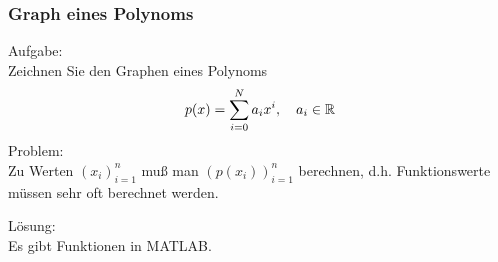 \begin{frame}[fragile]\frametitle{Graph eines Polynoms}

\alert{Aufgabe:}\\
Zeichnen Sie  den Graphen eines Polynoms
\vspace*{-0.4cm}
\[ p(x)= \sum_{i=0}^N a_i x^i, \quad a_i \in \mathbb{R} 
\vspace*{-0.4cm} \]
\alert{Problem:}\\
Zu Werten $(x_i)_{i=1}^n$ muß man $(p(x_i))_{i=1}^n$ berechnen,
d.h. Funktionswerte müssen sehr oft berechnet werden.

\alert{Lösung:}\\
Es gibt Funktionen in MATLAB.
\end{frame}

